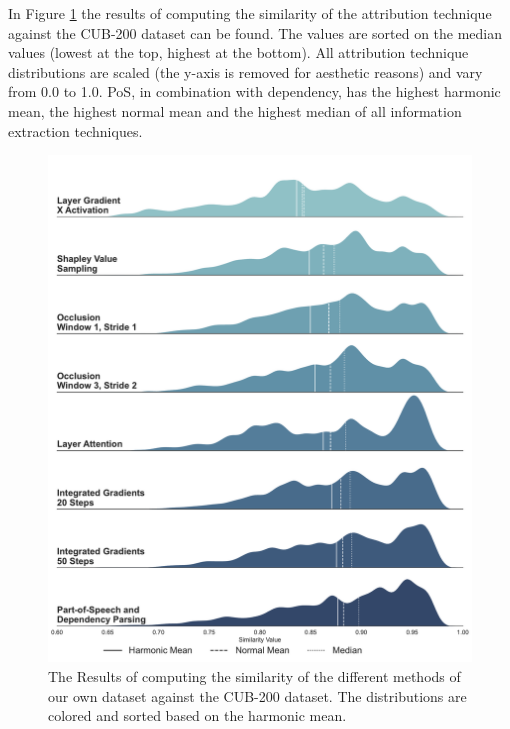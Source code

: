 \documentclass[a4paper, 12pt, oneside]{book} %
\begin{document}
In Figure \ref{fig:hmean_violin} the results of computing the similarity of the attribution technique against the CUB-200 dataset can be found.
The values are sorted on the median values (lowest at the top, highest at the bottom).
All attribution technique distributions are scaled (the y-axis is removed for aesthetic reasons) and vary from 0.0 to 1.0.
PoS, in combination with dependency, has the highest harmonic mean, the highest normal mean and the highest median of all information extraction techniques.
\begin{figure}[htpb]
 \centering
 \includegraphics[width=\textwidth]{figures/densities.pdf}
 \caption[Similarity results]{The Results of computing the similarity of the different methods of our own dataset against the CUB-200 dataset. The distributions are colored and sorted based on the harmonic mean.}
 \label{fig:hmean_violin}
\end{figure}
\end{document}
